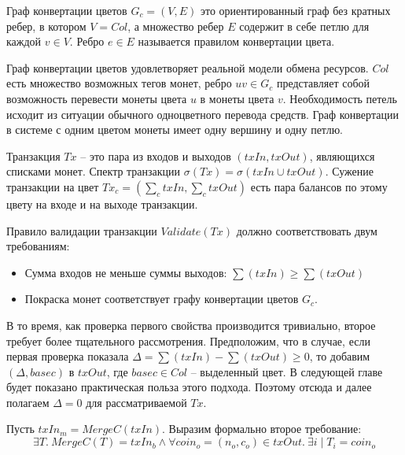 \documentclass[specification,annotation]{itmo-student-thesis}
\begin{document}
\begin{definition}
Граф конвертации цветов $G_c = (V,E)$ это ориентированный граф без
кратных ребер, в котором $V = Col$, а множество ребер $E$ содержит в
себе петлю для каждой $v \in V$. Ребро $e \in E$ называется правилом
конвертации цвета.
\end{definition}

Граф конвертации цветов удовлетворяет реальной модели обмена
ресурсов. $Col$ есть множество возможных тегов монет, ребро $uv \in
G_c$ представляет собой возможность перевести монеты цвета $u$ в
монеты цвета $v$. Необходимость петель исходит из ситуации обычного
одноцветного перевода средств. Граф конвертации в системе с одним
цветом монеты имеет одну вершину и одну петлю.

\begin{definition}
Транзакция $Tx$ -- это пара из входов и выходов $(txIn, txOut)$,
являющихся списками монет. Спектр транзакции $\sigma(Tx) = \sigma(txIn
\cup txOut)$. Сужение транзакции на цвет $Tx_c = (\sum_c{txIn},
\sum_c{txOut})$ есть пара балансов по этому цвету на входе и на выходе
транзакции.
\end{definition}

Правило валидации транзакции $Validate(Tx)$ должно соответствовать
двум требованиям:
\begin{itemize}
\item Сумма входов не меньше суммы выходов: $\sum(txIn) \geq \sum(txOut)$
\item Покраска монет соответствует графу конвертации цветов $G_c$.
\end{itemize}

В то время, как проверка первого свойства производится тривиально,
второе требует более тщательного рассмотрения. Предположим, что в
случае, если первая проверка показала $\Delta = \sum(txIn) -
\sum(txOut) \geq 0$, то добавим $(\Delta, basec)$ в $txOut$, где
$basec \in Col$ -- выделенный цвет. В следующей главе будет показано
практическая польза этого подхода. Поэтому отсюда и далее полагаем
$\Delta = 0$ для рассматриваемой $Tx$.

Пусть $txIn_m = MergeC(txIn)$. Выразим формально второе требование:
$$
\exists T . \ MergeC(T) = txIn_b \wedge \forall coin_o = (n_o,c_o) \in txOut . \ \exists i \mid T_i = coin_o
$$
\end{document}
